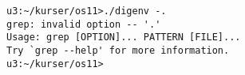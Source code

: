 \begin{lstlisting}
u3:~/kurser/os11>./digenv -.
grep: invalid option -- '.'
Usage: grep [OPTION]... PATTERN [FILE]...
Try `grep --help' for more information.
u3:~/kurser/os11>
\end{lstlisting}